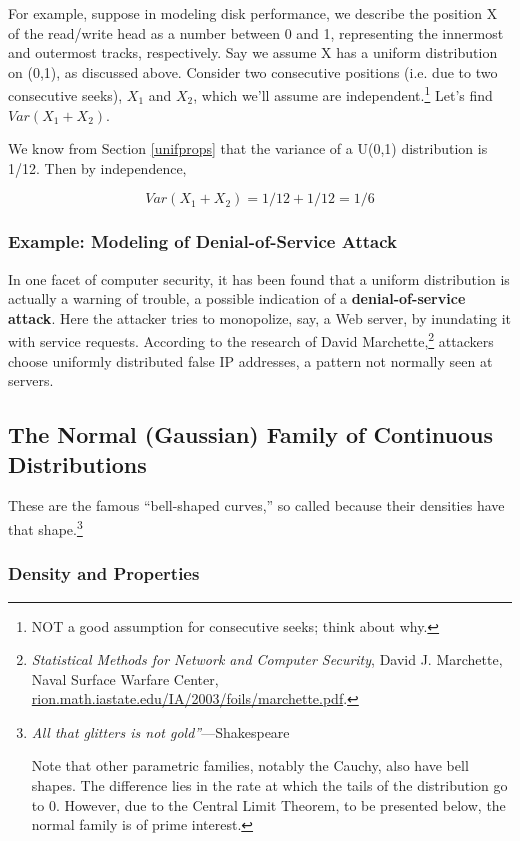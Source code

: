 For example, suppose in modeling disk performance, we describe the
position X of the read/write head as a number between 0 and 1,
representing the innermost and outermost tracks, respectively.  Say we
assume X has a uniform distribution on (0,1), as discussed above.
Consider two consecutive positions (i.e.  due to two consecutive seeks),
$X_1$ and $X_2$, which we'll assume are independent.\footnote{NOT a good
assumption for consecutive seeks; think about why.} Let's find $Var(X_1
+ X_2)$.

We know from Section \ref{unifprops} that the variance of a U(0,1)
distribution is 1/12.  Then by independence,

\begin{equation}
Var(X_1 + X_2) = 1/12 + 1/12 = 1/6
\end{equation}

\subsubsection{Example:  Modeling of Denial-of-Service Attack}

In one facet of computer security, it has been found that a uniform
distribution is actually a warning of trouble, a possible indication of
a {\bf denial-of-service attack}.  Here the attacker tries to
monopolize, say, a Web server, by inundating it with service requests.
According to the research of David Marchette,\footnote{{\it Statistical
Methods for Network and Computer Security}, David J. Marchette, Naval
Surface Warfare Center,
\url{rion.math.iastate.edu/IA/2003/foils/marchette.pdf}.} attackers
choose uniformly distributed false IP addresses, a pattern not normally
seen at servers.

\subsection{The Normal (Gaussian) Family of Continuous Distributions}  
\label{normalfam}

These are the famous ``bell-shaped curves,'' so called because their
densities have that shape.\footnote{{\it All that glitters is not
gold''}---Shakespeare

Note that other parametric families, notably the Cauchy, also have bell
shapes.  The difference lies in the rate at which the tails of the
distribution go to 0.  However, due to the Central Limit Theorem, to be
presented below, the normal family is of prime interest.}

\subsubsection{Density and Properties}

